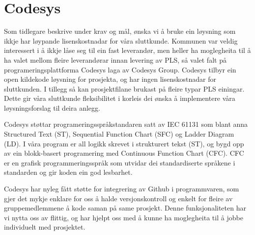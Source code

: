 \section{Codesys}
\thispagestyle{fancy}
Som tidlegare beskrive under krav og mål, ønska vi å bruke ein løysning som ikkje har løypande lisenskostnadar for våra sluttkunde. 
Kommunen var veldig interessert i å ikkje låse seg til ein fast leverandør, men heller ha moglegheita til å ha valet mellom fleire leverandørar innan levering av PLS, så valet falt på programeringsplattforma Codesys\citep{Codesys} laga av Codesys Group. 
Codesys tilbyr ein open kildekode løysning for prosjekta, og har ingen lisenskostnadar for sluttkunden. 
I tillegg så kan prosjektfilane brukast på fleire typar PLS einingar. 
Dette gir våra sluttkunde fleksibilitet i korleis dei ønska å implementere våra løysningsforslag til deira anlegg.

Codesys støttar programeringsspråkstandaren satt av IEC 61131 som blant anna Structured Text (ST), Sequential Function Chart (SFC) og Ladder Diagram (LD). I våra program er all logikk skrevet i strukturert tekst (ST), og bygd opp av ein blokk-basert programering med Continuous Function Chart (CFC). 
CFC er en grafisk programmeringsspråk som utvidar dei standardiserte språkene i standarden og gir koden ein god lesbarhet.

Codesys har nyleg fått støtte for integrering av Github i programmvaren, som gjer det mykje enklare for oss å halde versjonskontroll og enkelt for fleire av gruppemedlemmene å kode saman på same prosjekt. 
Denne funksjonaliteten har vi nytta oss av flittig, og har hjelpt oss med å kunne ha moglegheita til å jobbe individuelt med prosjektet. 
\newpage